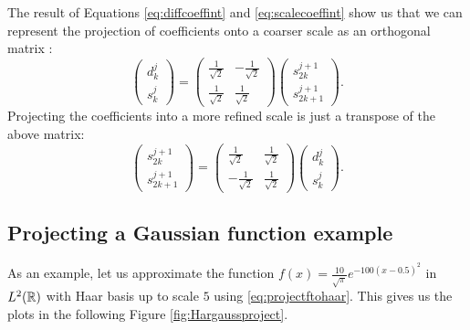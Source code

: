 \documentclass[../master_thesis.tex]{subfiles}
\begin{document}
The result of Equations \ref{eq:diffcoeffint} and \ref{eq:scalecoeffint} show us
that we can represent the projection of coefficients onto a coarser scale as an
orthogonal matrix \cite{Sorland, Beylkin:MRA}:
\begin{equation}
  \begin{pmatrix}
    d^{j}_k \\
    s^{j}_k
  \end{pmatrix} =
  \begin{pmatrix}
    \frac{1}{\sqrt{2}} & -\frac{1}{\sqrt{2}} \\
    \frac{1}{\sqrt{2}} & \frac{1}{\sqrt{2}}
  \end{pmatrix}
  \begin{pmatrix}
    s^{j+1}_{2k} \\
    s^{j+1}_{2k+1}
  \end{pmatrix}.
\end{equation}
Projecting the coefficients into a more refined scale is just a transpose of the
above matrix:
\begin{equation}
  \begin{pmatrix}
    s^{j+1}_{2k} \\
    s^{j+1}_{2k+1}
  \end{pmatrix} =
  \begin{pmatrix}
    \frac{1}{\sqrt{2}} & \frac{1}{\sqrt{2}} \\
    -\frac{1}{\sqrt{2}} & \frac{1}{\sqrt{2}}
  \end{pmatrix}
  \begin{pmatrix}
    d^{j}_k \\
    s^{j}_k
  \end{pmatrix}.
\end{equation}

\subsection{Projecting a Gaussian function example}
As an example, let us approximate the function
$f(x) = \frac{10}{\sqrt{\pi}}e^{-100(x - 0.5)^2}$ in $L^2(\mathbb{R})$
with Haar basis up to scale $5$ using \ref{eq:projectftohaar}. This gives us the
plots in the following Figure \ref{fig:Hargaussproject}.
\end{document}
